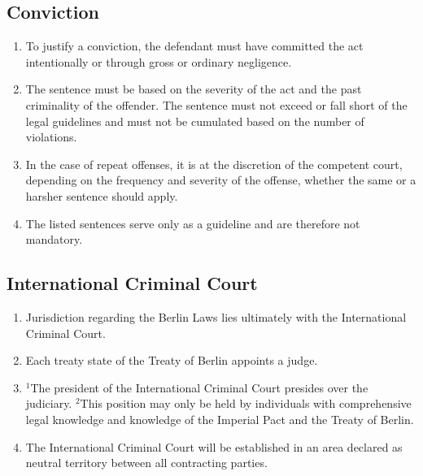 \documentclass{article}
\begin{document}
\subsection{Conviction}
\begin{enumerate}[(1)]
    \item To justify a conviction, the defendant must have committed the act intentionally or through gross or ordinary negligence.
    \item The sentence must be based on the severity of the act and the past criminality of the offender. The sentence must not exceed or fall short of the legal guidelines and must not be cumulated based on the number of violations.
    \item In the case of repeat offenses, it is at the discretion of the competent court, depending on the frequency and severity of the offense, whether the same or a harsher sentence should apply.
    \item The listed sentences serve only as a guideline and are therefore not mandatory.
\end{enumerate}

\subsection{International Criminal Court}
\begin{enumerate}[(1)]
    \item Jurisdiction regarding the Berlin Laws lies ultimately with the International Criminal Court.
    \item Each treaty state of the Treaty of Berlin appoints a judge.
    \item ${^1}$The president of the International Criminal Court presides over the judiciary. ${^2}$This position may only be held by individuals with comprehensive legal knowledge and knowledge of the Imperial Pact and the Treaty of Berlin.
    \item The International Criminal Court will be established in an area declared as neutral territory between all contracting parties.
\end{enumerate}
\end{document}
